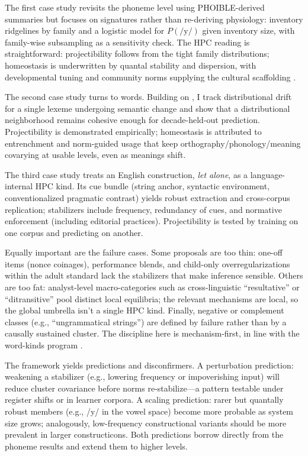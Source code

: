 \documentclass[12pt]{article}
\begin{document}
The first case study revisits the phoneme level using PHOIBLE-derived summaries but focuses on signatures rather than re-deriving physiology: inventory ridgelines by family and a logistic model for $P(\text{/y/})$ given inventory size, with family-wise subsampling as a sensitivity check. The HPC reading is straightforward: projectibility follows from the tight family distributions; homeostasis is underwritten by quantal stability and dispersion, with developmental tuning and community norms supplying the cultural scaffolding \citep{Ekstrom2025PhonemeTool}.

The second case study turns to words. Building on \citet{Miller2021WordsSpeciesKinds}, I track distributional drift for a single lexeme undergoing semantic change and show that a distributional neighborhood remains cohesive enough for decade-held-out prediction. Projectibility is demonstrated empirically; homeostasis is attributed to entrenchment and norm-guided usage that keep orthography/phonology/meaning covarying at usable levels, even as meanings shift.

The third case study treats an English construction, \textit{let alone}, as a language-internal HPC kind. Its cue bundle (string anchor, syntactic environment, conventionalized pragmatic contrast) yields robust extraction and cross-corpus replication; stabilizers include frequency, redundancy of cues, and normative enforcement (including editorial practices). Projectibility is tested by training on one corpus and predicting on another.

Equally important are the failure cases. Some proposals are too thin: one-off items (nonce coinages), performance blends, and child-only overregularizations within the adult standard lack the stabilizers that make inference sensible. Others are too fat: analyst-level macro-categories such as cross-linguistic ``resultative'' or ``ditransitive'' pool distinct local equilibria; the relevant mechanisms are local, so the global umbrella isn't a single HPC kind. Finally, negative or complement classes (e.g., ``ungrammatical strings'') are defined by failure rather than by a causally sustained cluster. The discipline here is mechanism-first, in line with the word-kinds program \citep{Miller2021WordsSpeciesKinds}.

The framework yields predictions and disconfirmers. A perturbation prediction: weakening a stabilizer (e.g., lowering frequency or impoverishing input) will reduce cluster covariance before norms re-stabilize---a pattern testable under register shifts or in learner corpora. A scaling prediction: rarer but quantally robust members (e.g., /y/ in the vowel space) become more probable as system size grows; analogously, low-frequency constructional variants should be more prevalent in larger constructicons. Both predictions borrow directly from the phoneme results \citep[Fig.\,2 p.\,7]{Ekstrom2025PhonemeTool} and extend them to higher levels.
\end{document}
